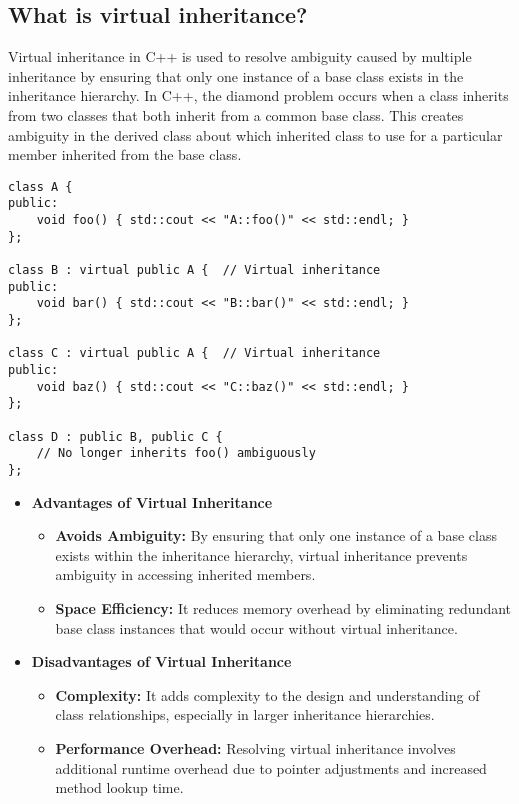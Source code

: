 \subsection{What is virtual inheritance?}
Virtual inheritance in C++ is used to resolve ambiguity caused by multiple inheritance by ensuring that only one instance of a base class exists in the inheritance hierarchy.
In C++, the diamond problem occurs when a class inherits from two classes that both inherit from a common base class. This creates ambiguity in the derived class about which inherited class to use for a particular member inherited from the base class.
\begin{tcolorbox}[title=Virtual Inheritance]
\begin{verbatim}
class A {
public:
    void foo() { std::cout << "A::foo()" << std::endl; }
};

class B : virtual public A {  // Virtual inheritance
public:
    void bar() { std::cout << "B::bar()" << std::endl; }
};

class C : virtual public A {  // Virtual inheritance
public:
    void baz() { std::cout << "C::baz()" << std::endl; }
};

class D : public B, public C {
    // No longer inherits foo() ambiguously
};
\end{verbatim}
\end{tcolorbox}
\begin{itemize}
    \item \textbf{Advantages of Virtual Inheritance}
    \begin{itemize}
    \item \textbf{Avoids Ambiguity:} By ensuring that only one instance of a base class exists within the inheritance hierarchy, virtual inheritance prevents ambiguity in accessing inherited members.
    \item \textbf{Space Efficiency:} It reduces memory overhead by eliminating redundant base class instances that would occur without virtual inheritance.
    \end{itemize}
    \item \textbf{Disadvantages of Virtual Inheritance}
    \begin{itemize}
    \item \textbf{Complexity:} It adds complexity to the design and understanding of class relationships, especially in larger inheritance hierarchies.
    \item \textbf{Performance Overhead:} Resolving virtual inheritance involves additional runtime overhead due to pointer adjustments and increased method lookup time.
    \end{itemize}
\end{itemize}

